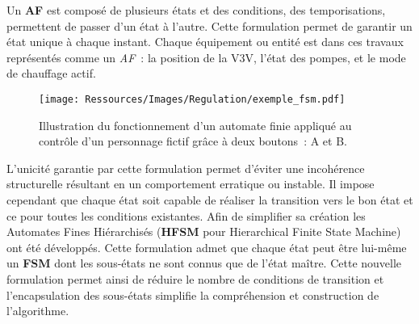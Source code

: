 Un \textbf{AF} est composé de plusieurs états et des conditions, des temporisations, permettent
de passer d’un état à l’autre. Cette formulation permet de garantir un état unique à chaque
instant. Chaque équipement ou entité est dans ces travaux représentés comme un \emph{AF}~: la
position de la V3V, l’état des pompes, et le mode de chauffage actif.

\begin{figure}
    \begin{center}
        \texttt{[image: Ressources/Images/Regulation/exemple\_fsm.pdf]}
    \end{center}
    \caption{Illustration du fonctionnement d’un automate finie appliqué au contrôle
             d’un personnage fictif grâce à deux boutons~: A et B.
             \label{fig:automate_fini}}
\end{figure}

L’unicité garantie par cette formulation permet d’éviter une incohérence structurelle
résultant en un comportement erratique ou instable. Il impose cependant que chaque état
soit capable de réaliser la transition vers le bon état et ce pour toutes les conditions
existantes. Afin de simplifier sa création les Automates Fines Hiérarchisés (\textbf{HFSM}
pour Hierarchical Finite State Machine) ont été développés. Cette formulation admet que
chaque état peut être lui-même un \textbf{FSM} dont les sous-états ne sont connus que de
l’état maître. Cette nouvelle formulation permet ainsi de réduire le nombre de conditions
de transition et l’encapsulation des sous-états simplifie la compréhension et construction
de l’algorithme.


